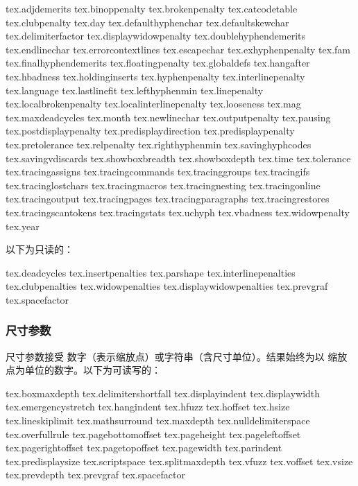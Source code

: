 \starttwocolumns
\begin{typing}
tex.adjdemerits
tex.binoppenalty
tex.brokenpenalty
tex.catcodetable
tex.clubpenalty
tex.day
tex.defaulthyphenchar
tex.defaultskewchar
tex.delimiterfactor
tex.displaywidowpenalty
tex.doublehyphendemerits
tex.endlinechar
tex.errorcontextlines
tex.escapechar
tex.exhyphenpenalty
tex.fam
tex.finalhyphendemerits
tex.floatingpenalty
tex.globaldefs
tex.hangafter
tex.hbadness
tex.holdinginserts
tex.hyphenpenalty
tex.interlinepenalty
tex.language
tex.lastlinefit
tex.lefthyphenmin
tex.linepenalty
tex.localbrokenpenalty
tex.localinterlinepenalty
tex.looseness
tex.mag
tex.maxdeadcycles
tex.month
tex.newlinechar
tex.outputpenalty
tex.pausing
tex.postdisplaypenalty
tex.predisplaydirection
tex.predisplaypenalty
tex.pretolerance
tex.relpenalty
tex.righthyphenmin
tex.savinghyphcodes
tex.savingvdiscards
tex.showboxbreadth
tex.showboxdepth
tex.time
tex.tolerance
tex.tracingassigns
tex.tracingcommands
tex.tracinggroups
tex.tracingifs
tex.tracinglostchars
tex.tracingmacros
tex.tracingnesting
tex.tracingonline
tex.tracingoutput
tex.tracingpages
tex.tracingparagraphs
tex.tracingrestores
tex.tracingscantokens
tex.tracingstats
tex.uchyph
tex.vbadness
tex.widowpenalty
tex.year
\end{typing}
\stoptwocolumns

以下为只读的：

\startthreecolumns
\begin{typing}
tex.deadcycles
tex.insertpenalties
tex.parshape
tex.interlinepenalties
tex.clubpenalties
tex.widowpenalties
tex.displaywidowpenalties
tex.prevgraf
tex.spacefactor
\end{typing}
\stopthreecolumns

\subsubsection{尺寸参数}

尺寸参数接受 \LUA 数字（表示缩放点）或字符串（含尺寸单位）。结果始终为以
缩放点为单位的数字。以下为可读写的：

\startthreecolumns
\begin{typing}
tex.boxmaxdepth
tex.delimitershortfall
tex.displayindent
tex.displaywidth
tex.emergencystretch
tex.hangindent
tex.hfuzz
tex.hoffset
tex.hsize
tex.lineskiplimit
tex.mathsurround
tex.maxdepth
tex.nulldelimiterspace
tex.overfullrule
tex.pagebottomoffset
tex.pageheight
tex.pageleftoffset
tex.pagerightoffset
tex.pagetopoffset
tex.pagewidth
tex.parindent
tex.predisplaysize
tex.scriptspace
tex.splitmaxdepth
tex.vfuzz
tex.voffset
tex.vsize
tex.prevdepth
tex.prevgraf
tex.spacefactor
\end{typing}
\stopthreecolumns

